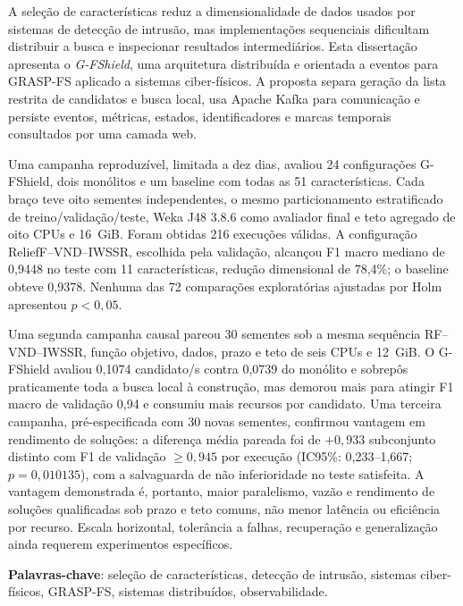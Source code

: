 \begin{resumo}[Resumo]

A seleção de características reduz a dimensionalidade de dados usados por sistemas de detecção de intrusão, mas implementações sequenciais dificultam distribuir a busca e inspecionar resultados intermediários. Esta dissertação apresenta o \textit{G-FShield}, uma arquitetura distribuída e orientada a eventos para GRASP-FS aplicado a sistemas ciber-físicos. A proposta separa geração da lista restrita de candidatos e busca local, usa Apache Kafka para comunicação e persiste eventos, métricas, estados, identificadores e marcas temporais consultados por uma camada web.

Uma campanha reproduzível, limitada a dez dias, avaliou 24 configurações G-FShield, dois monólitos e um baseline com todas as 51 características. Cada braço teve oito sementes independentes, o mesmo particionamento estratificado de treino/validação/teste, Weka J48 3.8.6 como avaliador final e teto agregado de oito CPUs e 16~GiB. Foram obtidas 216 execuções válidas. A configuração ReliefF--VND--IWSSR, escolhida pela validação, alcançou F1 macro mediano de 0,9448 no teste com 11 características, redução dimensional de 78,4\%; o baseline obteve 0,9378. Nenhuma das 72 comparações exploratórias ajustadas por Holm apresentou $p<0{,}05$.

Uma segunda campanha causal pareou 30 sementes sob a mesma sequência RF--VND--IWSSR, função objetivo, dados, prazo e teto de seis CPUs e 12~GiB. O G-FShield avaliou 0,1074 candidato/s contra 0,0739 do monólito e sobrepôs praticamente toda a busca local à construção, mas demorou mais para atingir F1 macro de validação 0,94 e consumiu mais recursos por candidato. Uma terceira campanha, pré-especificada com 30 novas sementes, confirmou vantagem em rendimento de soluções: a diferença média pareada foi de $+0{,}933$ subconjunto distinto com F1 de validação $\geq 0{,}945$ por execução (IC95\%: 0,233--1,667; $p=0{,}010135$), com a salvaguarda de não inferioridade no teste satisfeita. A vantagem demonstrada é, portanto, maior paralelismo, vazão e rendimento de soluções qualificadas sob prazo e teto comuns, não menor latência ou eficiência por recurso. Escala horizontal, tolerância a falhas, recuperação e generalização ainda requerem experimentos específicos.

\noindent
\textbf{Palavras-chave}: seleção de características, detecção de intrusão, sistemas ciber-físicos, GRASP-FS, sistemas distribuídos, observabilidade.

\end{resumo}
